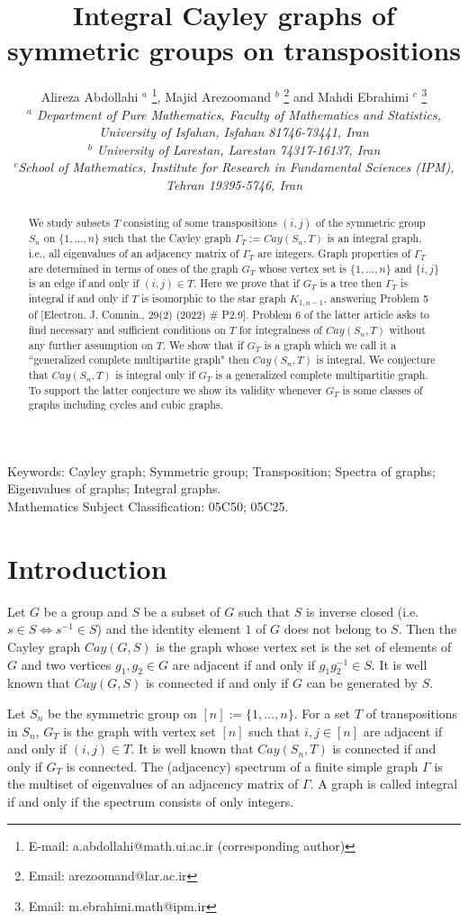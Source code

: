 \documentclass[12pt,a4paper]{article}
\date{}
\title{Integral Cayley graphs of symmetric groups on transpositions}
\author{Alireza Abdollahi $^{a}$ \footnote{E-mail:
a.abdollahi@math.ui.ac.ir (corresponding author)}, Majid Arezoomand $^{b}$ \footnote{Email: arezoomand@lar.ac.ir} and Mahdi Ebrahimi $^{c}$ \footnote{Email: m.ebrahimi.math@ipm.ir}\\
{\small\em$^a$ Department of Pure Mathematics, Faculty of Mathematics and Statistics,}\\ 
{\small\em University of Isfahan, Isfahan 81746-73441, Iran}\\
{\small\em$^b$ University of Larestan, Larestan 74317-16137, Iran}\\
{\small\em$^c$School of Mathematics, Institute for Research in Fundamental Sciences (IPM),}\\
{\small\em Tehran 19395-5746, Iran}
}
\begin{document}
\maketitle
\begin{abstract}
We study subsets $T$ consisting of some transpositions $(i,j)$ of the symmetric group $S_n$ on $\{1,\dots,n\}$ such that the Cayley graph $\Gamma_T:=Cay(S_n,T)$ is an integral graph, i.e., all eigenvalues of an adjacency matrix of $\Gamma_T$ are integers. 
Graph properties of  $\Gamma_T$ are determined in terms of ones of the graph $G_T$ whose vertex set is $\{1,\dots,n\}$ and $\{i,j\}$ is an edge if and only if $(i,j)\in T$. 
Here we prove that if $G_T$ is a tree then $\Gamma_T$ is integral if and only if $T$ is isomorphic to the star graph $K_{1,n-1}$, answering Problem 5 of [Electron. J. Comnin., 29(2) (2022) \# P2.9]. Problem 6 of the latter article asks to find necessary and sufficient conditions on $T$ for  integralness of $Cay(S_n,T)$ without any further assumption on $T$. We show that if $G_T$ is a graph which we  call it a ``generalized complete multipartite graph" then $Cay(S_n,T)$ is integral. We conjecture that $Cay(S_n,T)$ is integral only if $G_T$ is a generalized complete multipartitie graph. To support the latter conjecture we show its validity whenever $G_T$ is some classes of graphs including cycles and cubic graphs.        
\end{abstract}

\medskip \noindent
Keywords: Cayley graph; Symmetric group; Transposition; Spectra of graphs; Eigenvalues of graphs; Integral graphs.\\
Mathematics Subject Classification: 05C50; 05C25.


\section{Introduction}

Let $G$ be a group and $S$ be a subset of $G$ such that $S$ is inverse closed (i.e. $s\in S\Leftrightarrow s^{-1} \in S$) and the identity element $1$ of $G$ does not belong to $S$. Then the Cayley graph $Cay(G,S)$ is the graph whose vertex set is the set of elements of $G$ and two vertices $g_1,g_2\in G$ are adjacent if and only if $g_1 g_2^{-1} \in S$. It is well known that $Cay(G, S)$ is connected if and only if $G$ can be generated by $S$. 

Let $S_n$ be the symmetric group on $[n]:=\{1,\dots,n\}$.
For a set $T$ of transpositions in $S_n$, $G_T$ is the graph with vertex set $[n]$ such that $i, j \in [n]$ are adjacent if and only if $(i, j) \in T$. It is well known
that $Cay(S_n,T)$ is connected if and only if $G_T$ is connected. 
The (adjacency) spectrum of a finite simple graph $\Gamma$ is the multiset of eigenvalues of an adjacency matrix of $\Gamma$. A graph is called integral if and only if the spectrum consists of only integers.\\
\end{document}
